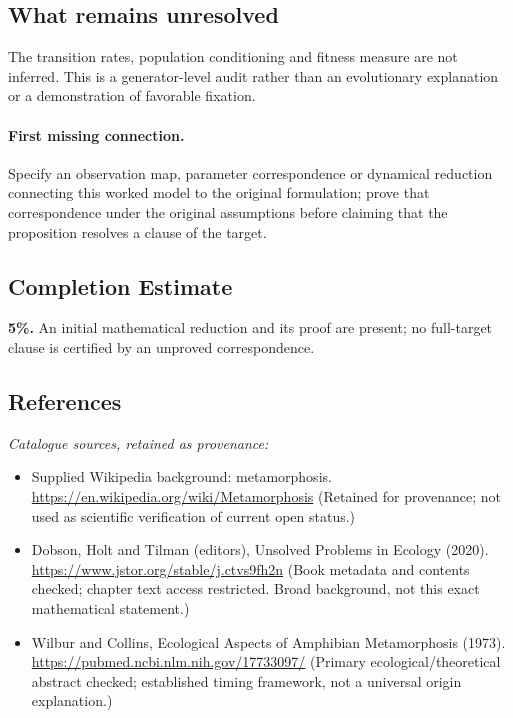 \documentclass[11pt]{article}
\begin{document}
\subsection{What remains unresolved}
The transition rates, population conditioning and fitness measure are not inferred. This is a generator-level audit rather than an evolutionary explanation or a demonstration of favorable fixation.
\paragraph{First missing connection.} Specify an observation map, parameter correspondence or dynamical reduction connecting this worked model to the original formulation; prove that correspondence under the original assumptions before claiming that the proposition resolves a clause of the target.
\subsection{Completion Estimate}
\textbf{5\%.} An initial mathematical reduction and its proof are present; no full-target clause is certified by an unproved correspondence.
\subsection{References}
\noindent\emph{Catalogue sources, retained as provenance:}
\begin{itemize}
\item Supplied Wikipedia background: metamorphosis. \url{https://en.wikipedia.org/wiki/Metamorphosis} (Retained for provenance; not used as scientific verification of current open status.)
\item Dobson, Holt and Tilman (editors), Unsolved Problems in Ecology (2020). \url{https://www.jstor.org/stable/j.ctvs9fh2n} (Book metadata and contents checked; chapter text access restricted. Broad background, not this exact mathematical statement.)
\item Wilbur and Collins, Ecological Aspects of Amphibian Metamorphosis (1973). \url{https://pubmed.ncbi.nlm.nih.gov/17733097/} (Primary ecological/theoretical abstract checked; established timing framework, not a universal origin explanation.)
\end{itemize}
\clearpage


\appendix
\end{document}
